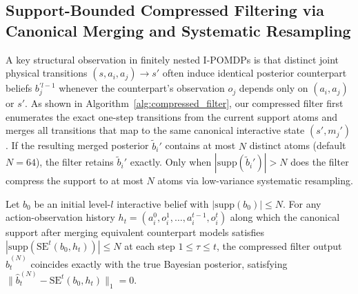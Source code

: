 \subsection{Support-Bounded Compressed Filtering via Canonical Merging and Systematic Resampling}

A key structural observation in finitely nested I-POMDPs is that distinct joint physical transitions $(s, a_i, a_j) \to s'$ often induce identical posterior counterpart beliefs $b_j^{\prime l-1}$ whenever the counterpart's observation $o_j$ depends only on $(a_i, a_j)$ or $s'$. As shown in Algorithm~\ref{alg:compressed_filter}, our compressed filter first enumerates the exact one-step transitions from the current support atoms and merges all transitions that map to the same canonical interactive state $(s', m_j')$. If the resulting merged posterior $\tilde{b}_i'$ contains at most $N$ distinct atoms (default $N=64$), the filter retains $\tilde{b}_i'$ exactly. Only when $|\mathrm{supp}(\tilde{b}_i')| > N$ does the filter compress the support to at most $N$ atoms via low-variance systematic resampling.

\begin{proposition}
  Let $b_0$ be an initial level-$l$ interactive belief with $|\mathrm{supp}(b_0)| \le N$. For any action-observation history $h_t = (a_i^0, o_i^1, \dots, a_i^{t-1}, o_i^t)$ along which the canonical support after merging equivalent counterpart models satisfies $|\mathrm{supp}(\mathrm{SE}^t(b_0, h_t))| \le N$ at each step $1 \le \tau \le t$, the compressed filter output $\hat{b}_t^{(N)}$ coincides exactly with the true Bayesian posterior, satisfying $\|\hat{b}_t^{(N)} - \mathrm{SE}^t(b_0, h_t)\|_1 = 0$.
  \label{prop:compressed_exact}
\end{proposition}

